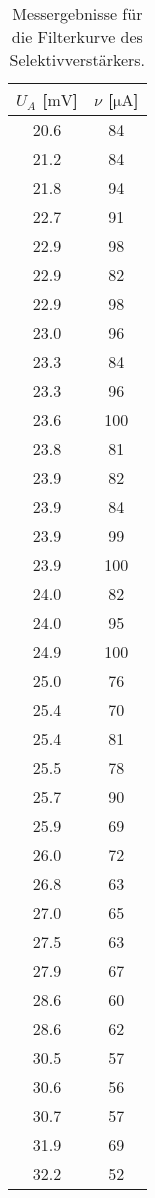 \begin{table}
  \centering
  \caption{Messergebnisse für die Filterkurve des Selektivverstärkers.}
  \label{tab:Messergebnisse}
  \begin{tabular}{c c}
    \toprule
    {$U_A$ [$\si{\milli\volt}$]} & {$\nu$ [$\si{\micro\ampere}$]}\\
    \midrule
      20.6   & 84 \\
      21.2   & 84 \\
      21.8   & 94 \\
      22.7   & 91 \\
      22.9   & 98 \\
      22.9   & 82 \\
      22.9   & 98 \\
      23.0   & 96 \\
      23.3   & 84 \\
      23.3   & 96 \\
      23.6   & 100 \\
      23.8   & 81 \\
      23.9   & 82 \\
      23.9   & 84 \\
      23.9   & 99 \\
      23.9   & 100 \\
      24.0   & 82 \\
      24.0   & 95 \\
      24.9   & 100 \\
      25.0   & 76 \\
      25.4   & 70 \\
      25.4   & 81 \\
      25.5   & 78 \\
      25.7   & 90 \\
      25.9   & 69 \\
      26.0   & 72 \\
      26.8   & 63 \\
      27.0   & 65 \\
      27.5   & 63 \\
      27.9   & 67 \\
      28.6   & 60 \\
      28.6   & 62 \\
      30.5   & 57 \\
      30.6   & 56 \\
      30.7   & 57 \\
      31.9   & 69 \\
      32.2   & 52 \\

\end{tabular}
\end{table}
